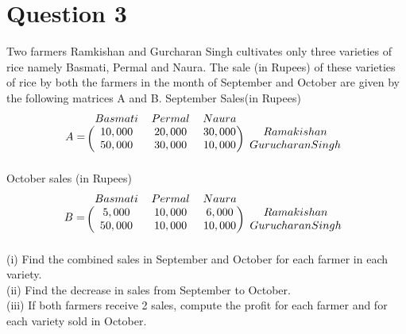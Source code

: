 \documentclass{article}
\begin{document}
\section*{Question 3}
Two farmers Ramkishan and Gurcharan Singh
cultivates only three varieties of rice namely
Basmati, Permal and Naura. The sale (in
Rupees) of these varieties of rice by both
the farmers in the month of September and
October are given by the following matrices
A and B.
September Sales(in Rupees)\\
\[ A= 
\begin{blockarray}{cccc}
Basmati & Permal & Naura \\
\begin{block}{(ccc)c}
  10, 000 & 20, 000& 30, 000 & Ramakishan\\
50, 000 &30, 000 &10, 000 & Gurucharan Singh\\
\end{block}
\end{blockarray}
 \]
October sales (in Rupees)\\
\[ B = 
\begin{blockarray}{cccc}
Basmati & Permal & Naura \\
\begin{block}{(ccc)c}
  5,000 & 10,000& 6,000 & Ramakishan\\
50,000 &10,000 &10,000 & Gurucharan Singh\\
\end{block}
\end{blockarray}
 \]
(i) Find the combined sales in September and
October for each farmer in each variety.\\
(ii) Find the decrease in sales from September
to October.\\
(iii) If both farmers receive 2%
sales, compute the profit for each farmer and
for each variety sold in October.
\end{document}
